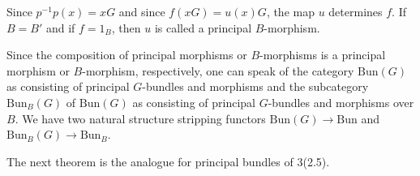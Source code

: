Since $p^{-1}p(x) = xG$ and since $f(xG) = u(x)G$, the map $u$ determines $f$. If $B = B'$ and if $f = 1_B$, then $u$ is called a principal $B$-morphism.

Since the composition of principal morphisms or $B$-morphisms is a principal morphism or $B$-morphism, respectively, one can speak of the category $\text{Bun}(G)$ as consisting of principal $G$-bundles and morphisms and the subcategory $\text{Bun}_B(G)$ of $\text{Bun}(G)$ as consisting of principal $G$-bundles and morphisms over $B$. We have two natural structure stripping functors $\text{Bun}(G) \rightarrow \text{Bun}$ and $\text{Bun}_B(G) \rightarrow \text{Bun}_B$.

The next theorem is the analogue for principal bundles of 3(2.5).
